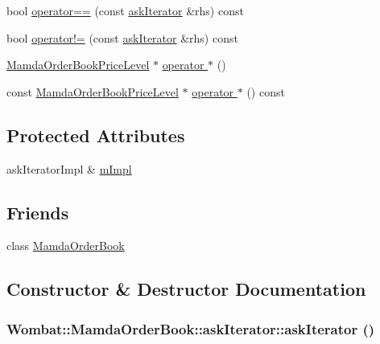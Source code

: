\begin{CompactItemize}
\item 
bool \hyperlink{classWombat_1_1MamdaOrderBook_1_1askIterator_8be6c858cd853645131ab12eb02d2e21}{operator==} (const \hyperlink{classWombat_1_1MamdaOrderBook_1_1askIterator}{ask\-Iterator} \&rhs) const 
\item 
bool \hyperlink{classWombat_1_1MamdaOrderBook_1_1askIterator_e19edae3ac36629bf47fa3c81408f5a8}{operator!=} (const \hyperlink{classWombat_1_1MamdaOrderBook_1_1askIterator}{ask\-Iterator} \&rhs) const 
\item 
\hyperlink{classWombat_1_1MamdaOrderBookPriceLevel}{Mamda\-Order\-Book\-Price\-Level} $\ast$ \hyperlink{classWombat_1_1MamdaOrderBook_1_1askIterator_992e3a609b4d0bb7c70a8bc2c50b6540}{operator $\ast$} ()
\item 
const \hyperlink{classWombat_1_1MamdaOrderBookPriceLevel}{Mamda\-Order\-Book\-Price\-Level} $\ast$ \hyperlink{classWombat_1_1MamdaOrderBook_1_1askIterator_9800f334830c63a8142f7e7b520db4d9}{operator $\ast$} () const 
\end{CompactItemize}
\subsection*{Protected Attributes}
\begin{CompactItemize}
\item 
ask\-Iterator\-Impl \& \hyperlink{classWombat_1_1MamdaOrderBook_1_1askIterator_fb11f11803a10f1997bc1305570e0b6c}{m\-Impl}
\end{CompactItemize}
\subsection*{Friends}
\begin{CompactItemize}
\item 
class \hyperlink{classWombat_1_1MamdaOrderBook_1_1askIterator_51cb271c9914c74f99c60cb638c26be7}{Mamda\-Order\-Book}
\end{CompactItemize}


\subsection{Constructor \& Destructor Documentation}
\hypertarget{classWombat_1_1MamdaOrderBook_1_1askIterator_7d34a020403c3fb154f0ce19d1a5c4f7}{
\subsubsection[askIterator]{\setlength{\rightskip}{0pt plus 5cm}Wombat::Mamda\-Order\-Book::ask\-Iterator::ask\-Iterator ()}}
\label{classWombat_1_1MamdaOrderBook_1_1askIterator_7d34a020403c3fb154f0ce19d1a5c4f7}


